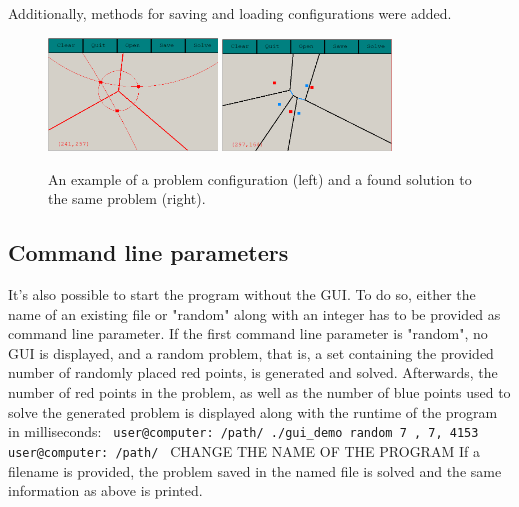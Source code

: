 \documentclass[a4paper,12pt]{article}
\begin{document}
Additionally, methods for saving and loading configurations were added.

\begin{figure}[h]
\includegraphics[width=0.4\textwidth]{pictures/gui.png}
\includegraphics[width=0.4\textwidth]{pictures/guisolved.png}
 \caption[Close up of \textit{Hemidactylus} sp.]
   {An example of a problem configuration (left) and a found solution to the same problem (right).}
\end{figure}


\subsection{Command line parameters}

It's also possible to start the program without the GUI. To do so, either the name of an existing file or "random" along with an integer has to be provided as command line parameter. If the first command line parameter is "random", no GUI is displayed, and a random problem, that is, a set containing the provided number of randomly placed red points, is generated and solved. Afterwards, the number of red points in the problem, as well as the number of blue points used to solve the generated problem is displayed along with the runtime of the program in milliseconds: \newline
\texttt{ \newline
user@computer:~/path/\textdollar{} ./gui\_demo random 7 , 7, 4153 \newline
user@computer:~/path/\textdollar{}
}
\newline
CHANGE THE NAME OF THE PROGRAM
\newline
If a filename is provided, the problem saved in the named file is solved and the same information as above is printed.
\end{document}
